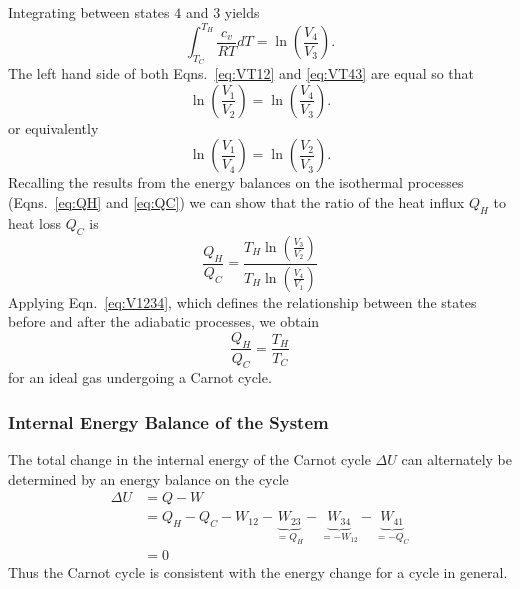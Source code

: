 Integrating between states $4$ and $3$ yields 
\begin{equation} \label{eq:VT43}
\int_{T_C}^{T_H} \frac{c_v}{RT} dT = \ln\left(\frac{V_4}{V_3}\right).
\end{equation}
The left hand side of both Eqns.~\eqref{eq:VT12} and \eqref{eq:VT43} are equal so that 
\begin{equation}
\ln\left(\frac{V_1}{V_2}\right) = \ln\left(\frac{V_4}{V_3}\right).
\end{equation}
or equivalently
\begin{equation} \label{eq:V1234}
\ln\left(\frac{V_1}{V_4}\right) = \ln\left(\frac{V_2}{V_3}\right).
\end{equation}
Recalling the results from the energy balances on the isothermal processes (Eqns.~\eqref{eq:QH} and \eqref{eq:QC}) we can show that the ratio of the heat influx $Q_H$ to heat loss $Q_C$ is
\begin{equation}
\frac{Q_H}{Q_C} = \frac{T_H\ln\left(\frac{V_3}{V_2}\right) }{T_H\ln\left(\frac{V_4}{V_1}\right)}
\end{equation}
Applying Eqn.~\eqref{eq:V1234}, which defines the relationship between the states before and after the adiabatic processes, we obtain
\begin{equation} \label{eq:HeatTemp}
\frac{Q_H}{Q_C} = \frac{T_H}{T_C}
\end{equation}
for an ideal gas undergoing a Carnot cycle. 
\subsubsection{Internal Energy Balance of the System}
The total change in the internal energy of the Carnot cycle $\Delta U$ can alternately be determined by an energy balance on the cycle
\begin{align}
\Delta U&= Q - W \label{eq:Ebalance} \\
&= Q_H - Q_C - W_{12} - \underbrace{W_{23}}_{=Q_H} - \underbrace{W_{34}}_{=-W_{12}} - \underbrace{W_{41}}_{=-Q_C} \label{eq:Ebaldetailed} \\
&= 0
\end{align}
Thus the Carnot cycle is consistent with the energy change for a cycle in general.
